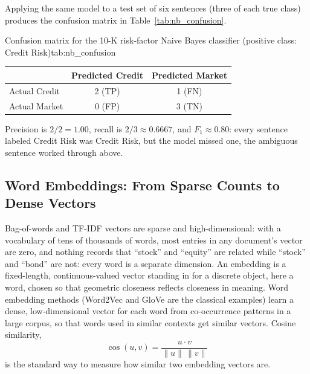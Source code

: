 \documentclass[../ai_in_finance]{subfiles}
\begin{document}
Applying the same model to a test set of six sentences (three of each true class) produces the confusion matrix in Table~\ref{tab:nb_confusion}.

\begin{booktable}[htbp]{Confusion matrix for the 10-K risk-factor Naive Bayes classifier (positive class: Credit Risk)}{tab:nb_confusion}
\begin{tabular}{lcc}
\toprule
 & Predicted Credit & Predicted Market \\
\midrule
Actual Credit & 2 (TP) & 1 (FN) \\
Actual Market & 0 (FP) & 3 (TN) \\
\bottomrule
\end{tabular}
\end{booktable}

Precision is $2/2 = 1.00$, recall is $2/3 \approx 0.6667$, and $F_1 \approx 0.80$: every sentence labeled Credit Risk was Credit Risk, but the model missed one, the ambiguous sentence worked through above.

\subsection{Word Embeddings: From Sparse Counts to Dense Vectors}
\label{sec:embeddings}

Bag-of-words and TF-IDF vectors are sparse and high-dimensional: with a vocabulary of tens of thousands of words, most entries in any document's
vector are zero, and nothing records that ``stock'' and ``equity'' are related while ``stock'' and ``bond'' are not: every
word is a separate dimension. An embedding is a fixed-length, continuous-valued vector standing in for a discrete object, here a word, chosen so that geometric closeness reflects closeness in meaning. Word embedding methods (Word2Vec and GloVe are the classical examples) learn a dense,
low-dimensional vector for each word from co-occurrence patterns in a large corpus, so that words used in similar contexts get similar
vectors. Cosine similarity,
\begin{equation}
\cos(u,v) = \frac{u \cdot v}{\|u\|\,\|v\|}
\label{eq:nlp-cosine}
\end{equation}
is the standard way to measure how similar two embedding vectors are.

\end{document}
